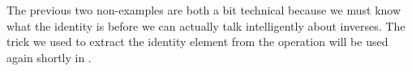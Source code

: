 \documentclass[../main.tex]{subfiles}
\begin{document}
The previous two non-examples are both a bit technical because we must know what the identity is before we can actually talk intelligently about inverses. The trick we used to extract the identity element from the operation will be used again shortly in .




\end{document}

